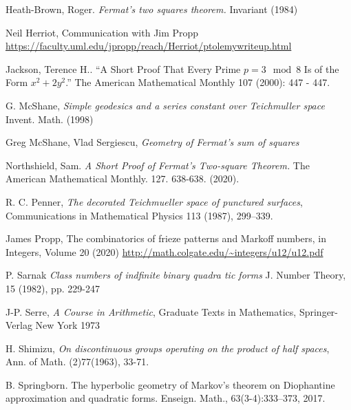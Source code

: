 \documentclass[12pt,a4paper]{amsart}
\begin{document}
Heath-Brown, Roger. 
\textit{ Fermat’s two squares theorem.} Invariant (1984) 

Neil Herriot, Communication with Jim Propp
\url{https://faculty.uml.edu/jpropp/reach/Herriot/ptolemywriteup.html}

Jackson, Terence H.. “A Short Proof That Every Prime $p = 3 \mod 8$ Is of the Form $x^2 + 2y^2$.” The American Mathematical Monthly 107 (2000): 447 - 447.




G. McShane,
\textit{Simple geodesics and a series constant over Teichmuller space}
Invent. Math. (1998)

Greg McShane, Vlad Sergiescu,
\textit{Geometry of Fermat's sum of squares}

Northshield, Sam. 
\textit{A Short Proof of Fermat’s Two-square Theorem.} The American Mathematical Monthly. 127. 638-638. (2020). 


R. C. Penner, 
\textit{The decorated Teichmueller space of punctured surfaces}, 
Communications in Mathematical Physics 113 (1987), 299–339.


James Propp,
The combinatorics of frieze patterns and Markoff numbers,
in  Integers, Volume 20 (2020)
\url{http://math.colgate.edu/~integers/u12/u12.pdf}


P. Sarnak
\textit{Class numbers of indfinite binary quadra tic forms}
J. Number Theory, 15 (1982), pp. 229-247

J-P. Serre,
\textit{A Course in Arithmetic},
Graduate Texts in Mathematics,
Springer-Verlag New York
1973

H. Shimizu, 
\textit{On discontinuous groups operating on the product of half spaces}, Ann. of Math. (2)77(1963), 33-71.



B. Springborn. The hyperbolic geometry of Markov’s theorem on Diophantine
approximation and quadratic forms. Enseign. Math., 63(3-4):333–373, 2017.
\end{document}
